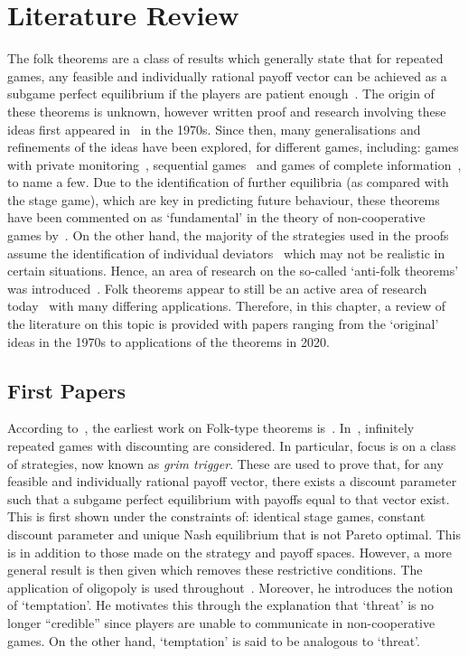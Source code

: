 \chapter{Literature Review}\label{ch:Lit_Review}

The folk theorems are a class of results which generally state that for repeated
games, any feasible and individually rational payoff vector can be achieved as a
subgame perfect equilibrium if the players are patient enough~\cite{Li2019}. The
origin of these theorems is unknown, however written proof and
research involving these ideas first appeared
in~\cite{aumann1976long,Friedman1971,Rubinstein1979} in the 1970s. Since then,
many generalisations and refinements of
the ideas have been explored, for different games, including:
games with private monitoring~\cite{Hoerner2006,Matsushima2004, Peski2012}, sequential
games~\cite{Bhaskar1998,Gossner1996,Wen2002} and games of complete
information~\cite{Abreu1994,Benoit_1985,Bernergard2019}, to
name a few. Due to the identification of further equilibria (as compared with
the stage game), which are key in predicting future behaviour, these theorems
have been commented on as `fundamental' in the theory of non-cooperative
games by~\cite{Hoerner2006, Li2015}. On the other hand, the majority of the strategies used in the
proofs assume the identification of individual deviators~\cite{Masso1989} which may not
be realistic in certain situations. Hence, an area of research on the so-called
`anti-folk theorems' was introduced~\cite{Masso1989,Peski2012,Yoon2001}. Folk theorems appear to still be an
active area of research today~\cite{Ikeda2020, Parras2020, Wang2020} with many differing applications.
Therefore, in this chapter, a review of the literature on this topic is provided
with papers ranging from the `original' ideas in the 1970s to applications of
the theorems in 2020. 


\section{First Papers}\label{sec:First_Papers}
According to~\cite{Abreu1994}, the earliest work on Folk-type theorems is~\cite{Friedman1971}. In~\cite{Friedman1971}, infinitely repeated games with
discounting are considered. In particular, focus is on a class of strategies,
now known as \emph{grim trigger}. These are used to prove that, for any feasible
and individually rational payoff vector, there exists a discount parameter such
that a subgame perfect equilibrium with payoffs equal to that vector exist. This
is first shown under the constraints of: identical stage games, constant
discount parameter and unique Nash equilibrium that is not Pareto optimal. This
is in addition to those made on the strategy and payoff spaces. However, a more
general result is then given which removes these restrictive conditions.
The application of oligopoly is used throughout~\cite{Friedman1971}. Moreover,
he introduces the notion of `temptation'. He motivates this through the
explanation that `threat' is no longer ``credible'' since players are unable to
communicate in non-cooperative games. On the other hand, `temptation' is said to be analogous to `threat'.

